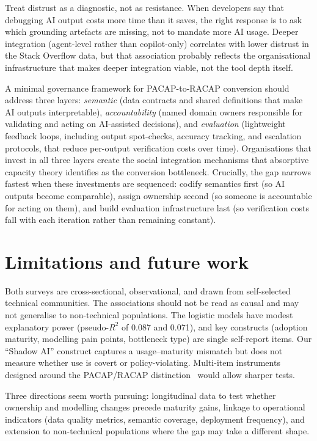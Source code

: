 \documentclass[twocolumn]{article}
\begin{document}
Treat distrust as a diagnostic, not as resistance. When developers say that debugging AI output costs more time than it saves, the right response is to ask which grounding artefacts are missing, not to mandate more AI usage. Deeper integration (agent-level rather than copilot-only) correlates with lower distrust in the Stack Overflow data, but that association probably reflects the organisational infrastructure that makes deeper integration viable, not the tool depth itself.

A minimal governance framework for PACAP-to-RACAP conversion should address three layers: \textit{semantic} (data contracts and shared definitions that make AI outputs interpretable), \textit{accountability} (named domain owners responsible for validating and acting on AI-assisted decisions), and \textit{evaluation} (lightweight feedback loops, including output spot-checks, accuracy tracking, and escalation protocols, that reduce per-output verification costs over time). Organisations that invest in all three layers create the social integration mechanisms that absorptive capacity theory identifies as the conversion bottleneck. Crucially, the gap narrows fastest when these investments are sequenced: codify semantics first (so AI outputs become comparable), assign ownership second (so someone is accountable for acting on them), and build evaluation infrastructure last (so verification costs fall with each iteration rather than remaining constant).


\section{Limitations and future work}

Both surveys are cross-sectional, observational, and drawn from self-selected technical communities. The associations should not be read as causal and may not generalise to non-technical populations. The logistic models have modest explanatory power (pseudo-$R^{2}$ of 0.087 and 0.071), and key constructs (adoption maturity, modelling pain points, bottleneck type) are single self-report items. Our ``Shadow AI'' construct captures a usage--maturity mismatch but does not measure whether use is covert or policy-violating. Multi-item instruments designed around the PACAP/RACAP distinction~\cite{jansen2005managing,flatten2011measure} would allow sharper tests.

Three directions seem worth pursuing: longitudinal data to test whether ownership and modelling changes precede maturity gains, linkage to operational indicators (data quality metrics, semantic coverage, deployment frequency), and extension to non-technical populations where the gap may take a different shape.



\end{document}

